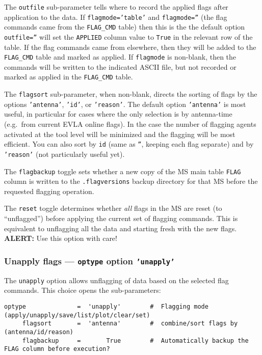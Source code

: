 The {\tt outfile} sub-parameter tells where to record the applied
flags after application to the data.  If {\tt flagmode='table'} and 
{\tt flagmode=''} (the flag commands came from the {\tt FLAG\_CMD}
table) then this is the the default option {\tt outfile=''} will set
the {\tt APPLIED} column value to {\tt True} in the relevant row of
the table.  If the flag commands came from elsewhere, then they will
be added to the {\tt FLAG\_CMD} table and marked as applied. If
{\tt flagmode} is non-blank, then the commands will be written to the
indicated ASCII file, but not recorded or marked as applied in the
{\tt FLAG\_CMD} table.

The {\tt flagsort} sub-parameter, when non-blank, directs the sorting of flags by the
options {\tt 'antenna'}, {\tt 'id'}, or {\tt 'reason'}.  The default option
{\tt 'antenna'} is most useful, in particular for cases where the only
selection is by antenna-time (e.g.\ from current EVLA online
flags). In the case the number of flagging agents activated at the
tool level will be minimized and the flagging will be most efficient.
You can also sort by {\tt id} (same as {\tt ''}, keeping each flag separate) 
and by {\tt 'reason'} (not particularly useful yet).

The {\tt flagbackup} toggle sets whether a new copy of the MS main
table {\tt FLAG} column is written to the {\tt .flagversions} backup
directory for that MS before the requested flagging operation.

The {\tt reset} toggle determines whether {\em all} flags in the MS
are reset (to ``unflagged'') before applying the current set of
flagging commands.  This is equivalent to unflagging all the data
and starting fresh with the new flags.  
{\bf ALERT:} Use this option with care!

\subsubsection{Unapply flags --- {\tt optype} option {\tt 'unapply'}}
\label{section:edit.flagcmd.optype.unapply}

The {\tt unapply} option allows unflagging of data based on the selected flag commands.
This choice opens the sub-parameters:
\small
\begin{verbatim}
optype              =  'unapply'        #  Flagging mode (apply/unapply/save/list/plot/clear/set)
     flagsort       =  'antenna'        #  combine/sort flags by (antenna/id/reason)
     flagbackup     =       True        #  Automatically backup the FLAG column before execution?
\end{verbatim}
\normalsize

